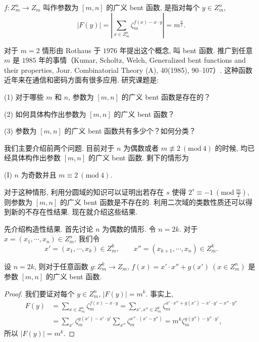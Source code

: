 \begin{definition}\label{def:ch9-8}
$f\colon Z_m^n\to Z_m$ 叫作参数为 $[m,n]$ 的广义 bent 函数, 是指对每个 $y\in Z_m^n$,
\[
  |F(y)|=\left|\sum_{x\in Z_m^n}\zeta_m^{f(x)-x\cdot y}\right|=m^{\frac{n}{2}}.
\]
\end{definition}

对于 $m=2$ 情形由 Rothaus 于 $1976$ 年提出这个概念, 叫 bent 函数. 推广到任意 $m$ 是 $1985$ 年的事情（Kumar, Scholtz, Welch, Generalized bent functions and their properties, Jour. Combinatorial Theory (A), 40(1985), 90--107）. 这种函数近年来在通信和密码方面有很多应用. 研究课题是:

(1) 对于哪些 $m$ 和 $n$, 参数为 $[m,n]$ 的广义 bent 函数是存在的？

(2) 如何具体构作出参数为 $[m,n]$ 的广义 bent 函数？

(3) 参数为 $[m,n]$ 的广义 bent 函数共有多少个？如何分类？

我们主要介绍前两个问题. 目前对于 $n$ 为偶数或者 $m\not\equiv 2\ (\mathrm{mod}\ 4)$ 的时候, 均已经具体构作出参数 $[m,n]$ 的广义 bent 函数. 剩下的情形为

(I) $n$ 为奇数并且 $m\equiv 2\ (\mathrm{mod}\ 4)$.

对于这种情形, 利用分圆域的知识可以证明出若存在 $s$ 使得 $2^s\equiv -1\ (\mathrm{mod}\ \frac{m}{2})$, 则参数为 $[m,n]$ 的广义 bent 函数是不存在的. 利用二次域的类数性质还可以得到新的不存在性结果. 现在就介绍这些结果.

先介绍构造性结果. 首先讨论 $n$ 为偶数的情形. 令 $n=2k$. 对于 $x=(x_1,\cdots,x_n)\in Z_m^n$, 我们令
\[
  x'=(x_1,\cdots,x_k)\in Z_m^k,\qquad
  x''=(x_{k+1},\cdots,x_n)\in Z_m^k.
\]

\begin{theorem}\label{thm:9.23}
设 $n=2k$, 则对于任意函数 $g\colon Z_m^k\to Z_m$, $f(x)=x'\cdot x''+g(x')\ (x\in Z_m^n)$ 是参数 $[m,n]$ 的广义 bent 函数.
\end{theorem}

\begin{proof}
我们要证对每个 $y\in Z_m^n$, $|F(y)|=m^k$. 事实上,
\[
  \begin{aligned}
    F(y)&=\sum_{x\in Z_m^n}\zeta_m^{f(x)-x\cdot y}
    =\sum_{x',x''\in Z_m^k}\zeta_m^{x'\cdot x''+g(x')-x'\cdot y'-x''\cdot y''}\\
    &=\sum_{x'}\zeta_m^{g(x')-x'\cdot y'}
    \sum_{x''}\zeta_m^{x''\cdot(x'-y'')}
    =m^k\zeta_m^{g(y'')-y''\cdot y'},
  \end{aligned}
\]
所以 $|F(y)|=m^k$.
\end{proof}

